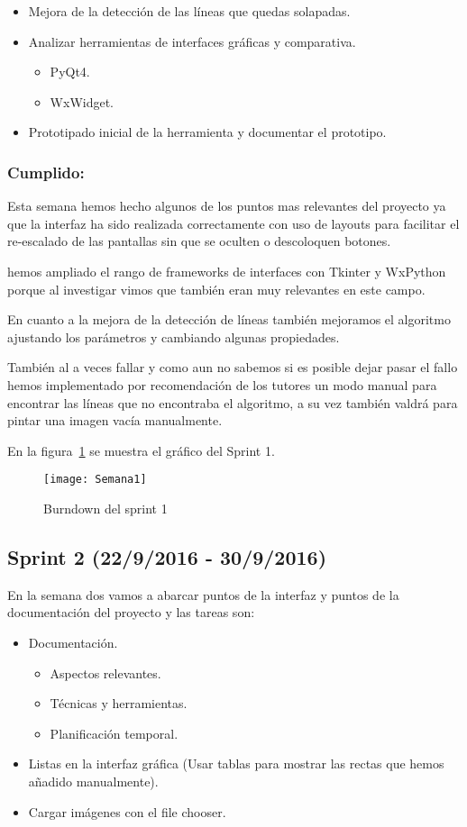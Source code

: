 \begin{itemize}
\item Mejora de la detección de las líneas que quedas solapadas. 
\item Analizar herramientas de interfaces gráficas y comparativa.
	\begin{itemize}
	\item PyQt4. 
	\item WxWidget.
	\end{itemize}
\item Prototipado inicial de la herramienta y documentar el prototipo.
\end{itemize}



\subsubsection{Cumplido:}
Esta semana hemos hecho algunos de los puntos mas relevantes del proyecto ya que la interfaz ha sido realizada correctamente con uso de layouts para facilitar el re-escalado de las pantallas sin que se oculten o descoloquen botones.

hemos ampliado el rango de frameworks de interfaces con Tkinter y WxPython porque al investigar vimos que también eran muy relevantes en este campo.

En cuanto a la mejora de la detección de líneas también mejoramos el algoritmo ajustando los parámetros y cambiando algunas propiedades.

También al a veces fallar y como aun no sabemos si es posible dejar pasar el fallo hemos implementado por recomendación de los tutores un modo manual para encontrar las líneas que no encontraba el algoritmo, a su vez también valdrá para pintar una imagen vacía manualmente.

En la figura~\ref{fig:A.2.1} se muestra el gráfico del Sprint 1.
\begin{figure}[h]
\centering
\texttt{[image: Semana1]}
\caption{Burndown del sprint 1}
\label{fig:A.2.1}
\end{figure}

\subsection{Sprint 2 (22/9/2016 - 30/9/2016)}
En la semana dos vamos a abarcar puntos de la interfaz y puntos de la documentación del proyecto y las tareas son:
 
\begin{itemize}
\item Documentación. 
\begin{itemize}
	\item Aspectos relevantes. 
	\item Técnicas y herramientas.
	\item Planificación temporal.
	\end{itemize}
\item Listas en la interfaz gráfica (Usar tablas para mostrar las rectas que hemos añadido manualmente).
\item Cargar imágenes con el file chooser.
\end{itemize}

